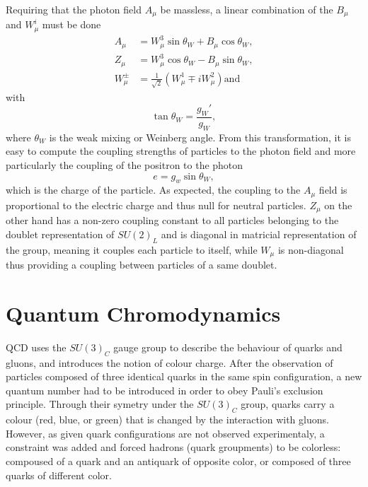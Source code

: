     Requiring that the photon field $ A_\mu $ be massless, a linear combination of the $ B_\mu $ and $ W^i_\mu $ must be done
    \begin{align}
      A_\mu & = W^3_\mu \sin \theta_W + B_\mu \cos \theta_W , \\
      Z_\mu & = W^3_\mu \cos \theta_W - B_\mu \sin \theta_W , \\
      W^\pm_\mu & = \frac{1}{\sqrt{2}} \left( W^1_\mu \mp i W^2_\mu \right) \text{and}
    \end{align}
    with
    \begin{equation}
      \tan \theta_W = \frac{g_W'}{g_W} ,
    \end{equation}
    where $ \theta_W $ is the weak mixing or Weinberg angle. From this transformation, it is easy to compute the coupling strengths of particles to the photon field and more particularly the coupling of the positron to the photon
    \begin{equation}
      e = g_w \sin \theta_W ,
    \end{equation}
    which is the charge of the particle. As expected, the coupling to the $ A_\mu $ field is proportional to the electric charge and thus null for neutral particles. $ Z_\mu $ on the other hand has a non-zero coupling constant to all particles belonging to the doublet representation of $ SU(2)_L $ and is diagonal in matricial representation of the group, meaning it couples each particle to itself, while $ W_\mu $ is non-diagonal thus providing a coupling between particles of a same doublet.

  \section{Quantum Chromodynamics}

    QCD uses the $ SU(3)_C $ gauge group to describe the behaviour of quarks and gluons, and introduces the notion of colour charge. After the observation of particles composed of three identical quarks in the same spin configuration, a new quantum number had to be introduced in order to obey Pauli's exclusion principle. Through their symetry under the $ SU(3)_C $ group, quarks carry a colour (red, blue, or green) that is changed by the interaction with gluons. However, as given quark configurations are not observed experimentaly, a constraint was added and forced hadrons (quark groupments) to be colorless: compoused of a quark and an antiquark of opposite color, or composed of three quarks of different color. \\

